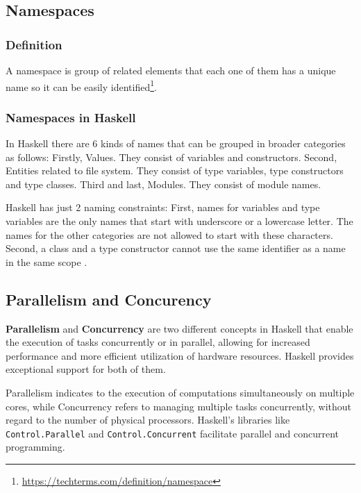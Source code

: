 \documentclass[a4paper, titlepage, twoside]{article}
\begin{document}
\subsection{Namespaces}
\label{sec:org8840b23}

\subsubsection{Definition}
\label{sec:org4a53c1a}

A namespace is group of related elements that each one of them has a unique name so it can be easily identified\footnote{\url{https://techterms.com/definition/namespace}}.

\subsubsection{Namespaces in Haskell}
\label{sec:org93c1dbe}

In Haskell there are 6 kinds of names that can be grouped in broader categories as follows: Firstly, Values. They consist of variables and constructors. Second, Entities related to file system. They consist of type variables, type constructors and type classes. Third and last, Modules. They consist of module names.

Haskell has just 2 naming constraints: First, names for variables and type variables are the only names that start with underscore or a lowercase letter. The names for the other categories are not allowed to start with these characters. Second, a class and a type constructor cannot use the same identifier as a name in the same scope \autocite{marlowHaskell2010Language2010}.

\subsection{Parallelism and Concurency}
\label{sec:org7e0276f}

\textbf{Parallelism} and \textbf{Concurrency} are two different concepts in Haskell that enable the execution of tasks concurrently or in parallel, allowing for increased performance and more efficient utilization of hardware resources. Haskell provides exceptional support for both of them.

Parallelism indicates to the execution of computations simultaneously on multiple cores, while Concurrency refers to managing multiple tasks concurrently, without regard to the number of physical processors. Haskell's libraries like \texttt{Control.Parallel} and \texttt{Control.Concurrent} facilitate parallel and concurrent programming.
\end{document}
